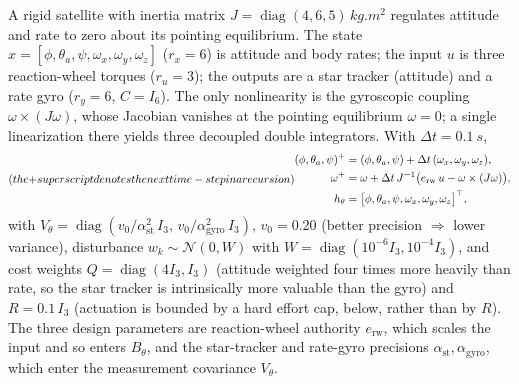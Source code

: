 \documentclass[twocolumn,amsthm]{autart}
\begin{document}
A rigid satellite with inertia matrix
$J=\operatorname{diag}(4,6,5)\,\si{kg.m^2}$ regulates attitude and rate to zero
about its pointing equilibrium.
The state $x=[\phi,\theta_a,\psi,\omega_x,\omega_y,\omega_z]$ ($r_x=6$) is attitude and body rates; the input $u$ is three reaction-wheel
torques ($r_u=3$); the outputs are a star tracker (attitude) and a rate gyro
($r_y=6$, $C=I_6$). The only nonlinearity is the gyroscopic coupling $\omega\times
(J\omega)$, whose Jacobian vanishes at the pointing equilibrium $\omega=0$;
a single linearization there yields three decoupled double integrators.
With $\Delta t=\SI{0.1}{s}$,
\begin{subequations}\label{eq:adcs-model} (the $+$ superscript denotes the next time-step in a recursion)
\begin{align}
(\phi,\theta_a,\psi)^{+} &= (\phi,\theta_a,\psi) + \Delta t\,(\omega_x,\omega_y,\omega_z),\\
\omega^{+} &= \omega + \Delta t\,J^{-1}\big(e_{\mathrm{rw}}\,u - \omega\times(J\omega)\big),\\
h_\theta &= \big[\phi,\theta_a,\psi, \omega_x,\omega_y,\omega_z\big]^\top,
\end{align}
\end{subequations}
with $V_\theta=\operatorname{diag}(v_0/\alpha_{\mathrm{st}}^2\,I_3,\,v_0/\alpha_{\mathrm{gyro}}^2\,I_3), \, v_0=0.20$
(better precision $\Rightarrow$ lower variance), disturbance $w_k\sim\mathcal N(0,W)$ with
$W=\operatorname{diag}(10^{-6}I_3,10^{-4}I_3)$, and cost weights
$Q=\operatorname{diag}(4I_3,I_3)$ (attitude weighted four times more heavily than
rate, so the star tracker is intrinsically more valuable than the gyro) and
$R=0.1\,I_3$ (actuation is bounded by a hard effort cap, below, rather than by $R$).
The three design parameters are reaction-wheel authority $e_{\mathrm{rw}}$, which
scales the input and so enters $B_\theta$, and the star-tracker and rate-gyro precisions
$\alpha_{\mathrm{st}},\alpha_{\mathrm{gyro}}$, which enter the measurement
covariance $V_\theta$.
\end{document}
